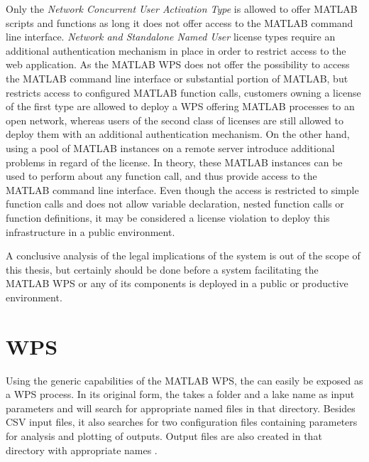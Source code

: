     Only the \emph{Network Concurrent User Activation Type} is allowed to offer MATLAB scripts and functions as long it does not offer access to the MATLAB command line interface. \emph{Network and Standalone Named User} license types require an additional authentication mechanism in place in order to restrict access to the web application. As the MATLAB WPS does not offer the possibility to access the MATLAB command line interface or substantial portion of MATLAB, but restricts access to configured MATLAB function calls, customers owning a license of the first type are allowed to deploy a \ac{WPS} offering MATLAB processes to an open network, whereas users of the second class of licenses are still allowed to deploy them with an additional authentication mechanism. On the other hand, using a pool of MATLAB instances on a remote server introduce additional problems in regard of the license. In theory, these MATLAB instances can be used to perform about any function call, and thus provide access to the MATLAB command line interface. Even though the access is restricted to simple function calls and does not allow variable declaration, nested function calls or function definitions, it may be considered a license violation to deploy this infrastructure in a public environment.

    A conclusive analysis of the legal implications of the system is out of the scope of this thesis, but certainly should be done before a system facilitating the MATLAB WPS or any of its components is deployed in a public or productive environment.
  \section{\la WPS}
    \label{sec:matlab:la}
    Using the generic capabilities of the MATLAB WPS, the \la can easily be exposed as a \ac{WPS} process. In its original form, the \la takes a folder and a lake name as input parameters and will search for appropriate named files in that directory. Besides CSV input files, it also searches for two configuration files containing parameters for analysis and plotting of outputs. Output files are also created in that directory with appropriate names \citep{lamanual}.

